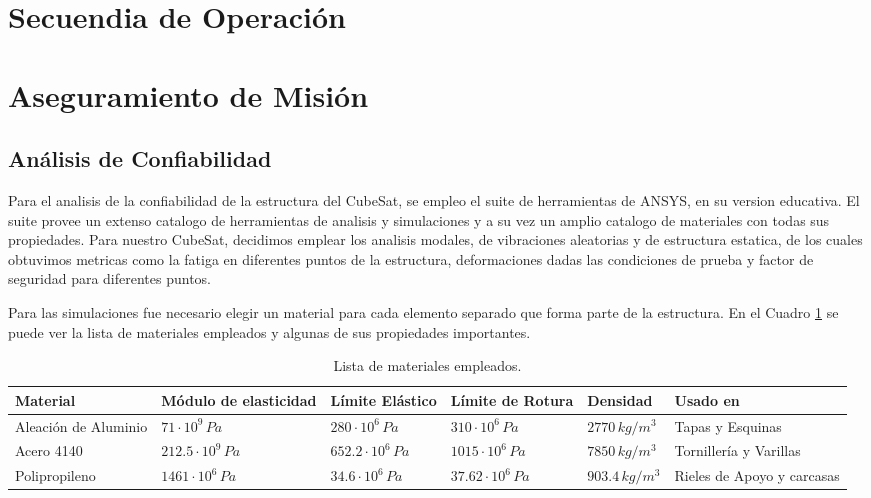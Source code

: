\section{Secuendia de Operación}

\section{Aseguramiento de Misión}

  \subsection{Análisis de Confiabilidad}
    Para el analisis de la confiabilidad de la estructura del CubeSat, se empleo el suite de
    herramientas de ANSYS, en su version educativa. El suite provee un extenso catalogo de
    herramientas de analisis y simulaciones y a su vez un amplio catalogo de materiales con
    todas sus propiedades. Para nuestro CubeSat, decidimos emplear los analisis modales, de
    vibraciones aleatorias y de estructura estatica, de los cuales obtuvimos metricas como la
    fatiga en diferentes puntos de la estructura, deformaciones dadas las condiciones de prueba
    y factor de seguridad para diferentes puntos.

    Para las simulaciones fue necesario elegir un material para cada elemento separado que
    forma parte de la estructura. En el Cuadro \ref{tab:materiales_empleados} se puede ver la
    lista de materiales empleados y algunas de sus propiedades importantes.

    \begin{table}[H]
    \centering
    \small %
    \begin{tabular}{|p{2.2cm}|p{2.3cm}|p{2.3cm}|p{2.5cm}|p{2cm}|p{2.5cm}|}
    \hline
    \textbf{Material} & \centering\textbf{Módulo de elasticidad} & \centering\textbf{Límite Elástico} & \centering\textbf{Límite de Rotura} & \centering\textbf{Densidad} & \centering\textbf{Usado en} \tabularnewline
    \hline
    Aleación de Aluminio & \centering $71 \cdot 10^9\,Pa$ & \centering $280 \cdot 10^6\,Pa$ & \centering $310 \cdot 10^6\,Pa$ & \centering $2770\,kg/m^3$ & Tapas y Esquinas \tabularnewline
    \hline
    Acero 4140 & \centering $212.5 \cdot 10^9\,Pa$ & \centering $652.2 \cdot 10^6\,Pa$ & \centering $1015 \cdot 10^6\,Pa$ & \centering $7850\,kg/m^3$ & Tornillería y Varillas \tabularnewline
    \hline
    Polipropileno & \centering $1461 \cdot 10^6\,Pa$ & \centering $34.6 \cdot 10^6\,Pa$ & \centering $37.62 \cdot 10^6\,Pa$ & \centering $903.4\,kg/m^3$ & Rieles de Apoyo y carcasas \tabularnewline
    \hline
    \end{tabular}
    \caption{Lista de materiales empleados.}
    \label{tab:materiales_empleados}
    \end{table}

